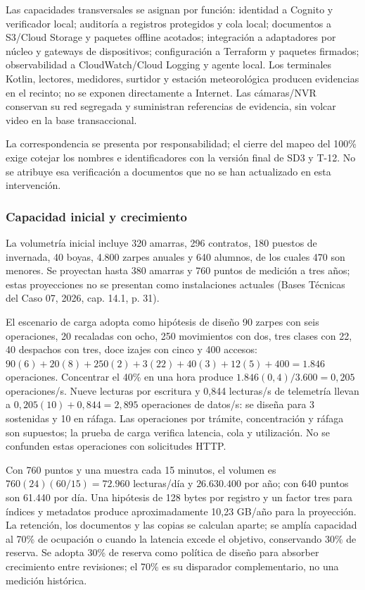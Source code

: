 \documentclass[11pt,letterpaper]{report}
\begin{document}
Las capacidades transversales se asignan por función: identidad a Cognito y verificador local; auditoría a registros protegidos y cola local; documentos a S3/Cloud Storage y paquetes offline acotados; integración a adaptadores por núcleo y gateways de dispositivos; configuración a Terraform y paquetes firmados; observabilidad a CloudWatch/Cloud Logging y agente local. Los terminales Kotlin, lectores, medidores, surtidor y estación meteorológica producen evidencias en el recinto; no se exponen directamente a Internet. Las cámaras/NVR conservan su red segregada y suministran referencias de evidencia, sin volcar video en la base transaccional.

La correspondencia se presenta por responsabilidad; el cierre del mapeo del 100\% exige cotejar los nombres e identificadores con la versión final de SD3 y T-12. No se atribuye esa verificación a documentos que no se han actualizado en esta intervención.

\subsubsection*{Capacidad inicial y crecimiento}

La volumetría inicial incluye 320 amarras, 296 contratos, 180 puestos de invernada, 40 boyas, 4.800 zarpes anuales y 640 alumnos, de los cuales 470 son menores. Se proyectan hasta 380 amarras y 760 puntos de medición a tres años; estas proyecciones no se presentan como instalaciones actuales (Bases Técnicas del Caso 07, 2026, cap. 14.1, p. 31).

El escenario de carga adopta como hipótesis de diseño 90 zarpes con seis operaciones, 20 recaladas con ocho, 250 movimientos con dos, tres clases con 22, 40 despachos con tres, doce izajes con cinco y 400 accesos: $90(6)+20(8)+250(2)+3(22)+40(3)+12(5)+400=1.846$ operaciones. Concentrar el 40\% en una hora produce $1.846(0,4)/3.600=0,205$ operaciones/s. Nueve lecturas por escritura y 0,844 lecturas/s de telemetría llevan a $0,205(10)+0,844=2,895$ operaciones de datos/s: se diseña para 3 sostenidas y 10 en ráfaga. Las operaciones por trámite, concentración y ráfaga son supuestos; la prueba de carga verifica latencia, cola y utilización. No se confunden estas operaciones con solicitudes HTTP.

Con 760 puntos y una muestra cada 15 minutos, el volumen es $760(24)(60/15)=72.960$ lecturas/día y $26.630.400$ por año; con 640 puntos son 61.440 por día. Una hipótesis de 128 bytes por registro y un factor tres para índices y metadatos produce aproximadamente 10,23 GB/año para la proyección. La retención, los documentos y las copias se calculan aparte; se amplía capacidad al 70\% de ocupación o cuando la latencia excede el objetivo, conservando 30\% de reserva. Se adopta 30\% de reserva como política de diseño para absorber crecimiento entre revisiones; el 70\% es su disparador complementario, no una medición histórica.
\end{document}
